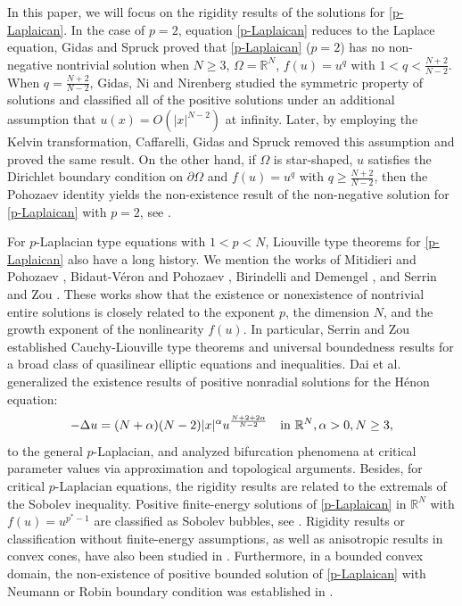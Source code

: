 \documentclass[10pt,a4paper]{amsart}
\numberwithin{equation}{section}
\newcommand{\pa}{\partial}
\newcommand{\R}{\mathbb{R}}
\begin{document}
In this paper, we will focus on the rigidity results of the solutions for \eqref{p-Laplaican}. In the case of  $p=2$, equation \eqref{p-Laplaican} reduces to the Laplace equation, Gidas and Spruck \cite{GS1981} proved that \eqref{p-Laplaican} ($p=2$) has no non-negative nontrivial solution when $N \geq 3$, $\Omega = \R^N$, $f(u) = u^q$ with $1< q < \frac{N+2}{N-2}$. When $q=\frac{N+2}{N-2}$, Gidas, Ni and Nirenberg \cite{GNN1979} studied the symmetric property of solutions and classified all of the positive solutions under an additional assumption that $u(x) = O(|x|^{N-2})$ at infinity. Later, by employing the Kelvin transformation, Caffarelli, Gidas and Spruck \cite{CGS1989} removed this assumption and proved the same result. On the other hand, if $\Omega$ is star-shaped, $u$ satisfies the Dirichlet boundary condition on $\pa\Omega$ and $f(u) = u^q$ with $q \geq \frac{N+2}{N-2}$, then the Pohozaev identity yields the non-existence result of the non-negative solution for \eqref{p-Laplaican} with $p=2$, see \cite{P1965}.

For $p$-Laplacian type equations with $1<p<N$, Liouville type theorems for \eqref{p-Laplaican} also have a long history. We mention the works of Mitidieri and Pohozaev \cite{MP1999,MP2001}, Bidaut-V\'{e}ron and Pohozaev \cite{BP2001}, Birindelli and Demengel \cite{BD2002}, and Serrin and Zou \cite{SZ2002}. These works show that the existence or nonexistence of nontrivial entire solutions is closely related to the exponent $p$, the dimension $N$, and the growth exponent of the nonlinearity $f(u)$. In particular, Serrin and Zou \cite{SZ2002} established Cauchy-Liouville type theorems and universal boundedness results for a broad class of quasilinear elliptic equations and inequalities. Dai et al. \cite{DDGL2026} generalized the existence results of positive nonradial solutions for the H\'{e}non equation:
 $$-\Delta u=(N+\alpha)(N-2)|x|^\alpha u^{\frac{N+2+2\alpha}{N-2}} \quad \hbox{in } \mathbb{R}^N, \alpha>0, N\geq 3,$$
 to the general $p$-Laplacian, and analyzed bifurcation phenomena at critical parameter values via approximation and topological arguments. Besides, for critical $p$-Laplacian equations, the rigidity  results are related to the extremals of the Sobolev inequality. Positive finite-energy solutions of \eqref{p-Laplaican} in $\R^N$ with $f(u) = u^{p^* -1}$ are classified as Sobolev bubbles, see \cite{DMMS2014, V2016, S2016}. Rigidity  results or classification without finite-energy assumptions, as well as anisotropic results in convex cones, have also been studied in \cite{CMR2023, O2025, CFR2020}. Furthermore, in a bounded convex domain, the non-existence of positive bounded solution of \eqref{p-Laplaican} with Neumann or Robin boundary condition was established in \cite{CCR2021}.
\end{document}
